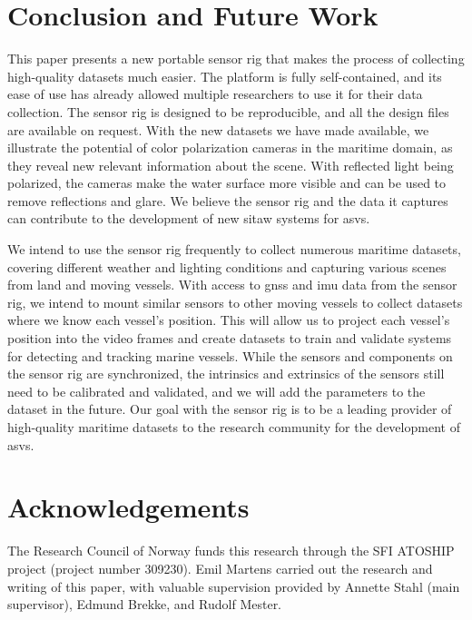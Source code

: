 \section{Conclusion and Future Work}
This paper presents a new portable sensor rig that makes the process of collecting high-quality datasets much easier.
The platform is fully self-contained, and its ease of use has already allowed multiple researchers to use it for their data collection.
The sensor rig is designed to be reproducible, and all the design files are available on request.
With the new datasets we have made available, we illustrate the potential of color polarization cameras in the maritime domain, as they reveal new relevant information about the scene.
With reflected light being polarized, the cameras make the water surface more visible and can be used to remove reflections and glare.
We believe the sensor rig and the data it captures can contribute to the development of new \gls{sitaw} systems for \glspl{asv}.

We intend to use the sensor rig frequently to collect numerous maritime datasets, covering different weather and lighting conditions and capturing various scenes from land and moving vessels.
With access to \gls{gnss} and \gls{imu} data from the sensor rig, we intend to mount similar sensors to other moving vessels to collect datasets where we know each vessel's position.
This will allow us to project each vessel's position into the video frames and create datasets to train and validate systems for detecting and tracking marine vessels.
While the sensors and components on the sensor rig are synchronized, the intrinsics and extrinsics of the sensors still need to be calibrated and validated, and we will add the parameters to the dataset in the future. Our goal with the sensor rig is to be a leading provider of high-quality maritime datasets to the research community for the development of \glspl{asv}.

\pagebreak
\section{Acknowledgements}
The Research Council of Norway funds this research through the SFI ATOSHIP project (project number 309230).
Emil Martens carried out the research and writing of this paper, with valuable supervision provided by Annette Stahl (main supervisor), Edmund Brekke, and Rudolf Mester.
